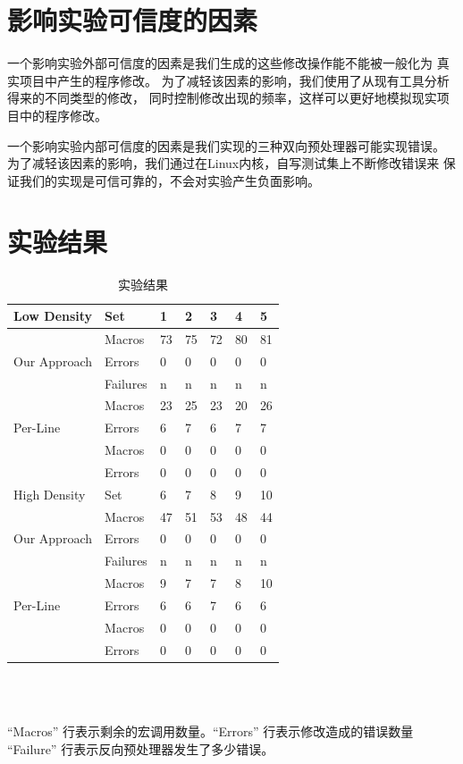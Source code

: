 \section{影响实验可信度的因素}
一个影响实验外部可信度的因素是我们生成的这些修改操作能不能被一般化为
真实项目中产生的程序修改。
为了减轻该因素的影响，我们使用了从现有工具分析得来的不同类型的修改，
同时控制修改出现的频率，这样可以更好地模拟现实项目中的程序修改。

一个影响实验内部可信度的因素是我们实现的三种双向预处理器可能实现错误。
为了减轻该因素的影响，我们通过在Linux内核，自写测试集上不断修改错误来
保证我们的实现是可信可靠的，不会对实验产生负面影响。

\section{实验结果}
\begin{table}[htbp]
  \caption{实验结果}\label{tbl:results}
\centering
\begin{tabular}{|l|l|lllll|}
  \hline
  Low Density & Set & 1 & 2 & 3 & 4 & 5\\
  \hline
  \multirow{3}{*}{Our Approach} &  Macros & 73 & 75 & 72 & 80 & 81 \\
  \cline{2-7}
              &Errors & 0 & 0 & 0 & 0 & 0  \\
  \cline{2-7}
              & Failures & n & n & n & n & n \\
  \hline
  \multirow{3}{*}{Per-Line} & Macros & 23 & 25 & 23 & 20 & 26 \\
  \cline{2-7}
              & Errors & 6 & 7 & 6 & 7 & 7  \\
  \hline
  \multirow{3}{*}{Per-File} & Macros & 0 & 0 & 0 & 0 & 0  \\
  \cline{2-7}
              & Errors & 0 & 0 & 0 & 0 & 0 \\
  \hline
  \hline
  High Density & Set & 6 & 7 & 8& 9& 10\\
  \hline
  \multirow{3}{*}{Our Approach} &Macros & 47 & 51 & 53 & 48 & 44 \\
  \cline{2-7}
              &  Errors & 0 & 0 & 0 & 0 & 0  \\
  \cline{2-7}
              & Failures & n & n & n & n & n \\
  \hline
  \multirow{3}{*}{Per-Line} & Macros & 9 & 7 & 7 & 8 & 10  \\
  \cline{2-7}
              & Errors & 6 & 6 & 7 & 6 & 6 \\
  \hline
  \multirow{3}{*}{Per-File} & Macros & 0 & 0 & 0 & 0 & 0  \\
  \cline{2-7}
              & Errors & 0 & 0 & 0 & 0 & 0 \\
  \hline\end{tabular}
\\
\parbox{\columnwidth}{ \ \\
\footnotesize ``Macros'' 行表示剩余的宏调用数量。``Errors'' 行表示修改造成的错误数量
      ``Failure'' 行表示反向预处理器发生了多少错误。}
\end{table}

